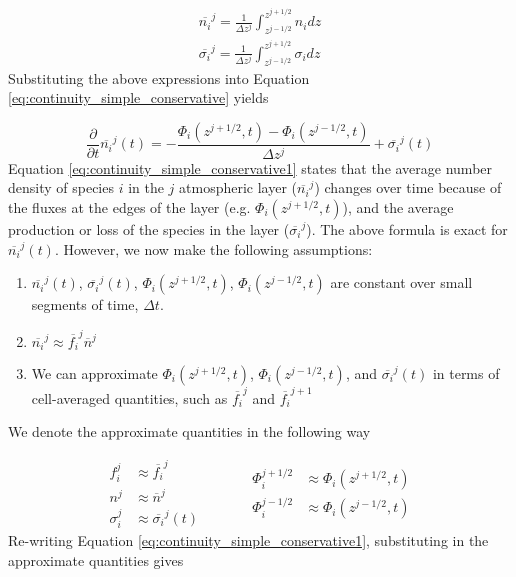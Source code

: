 \begin{align}
  \overline{n_i}^j = \frac{1}{\Delta z^j} \int_{z^{j-1/2}}^{z^{j+1/2}} n_i dz \\
  \overline{\sigma_i}^j = \frac{1}{\Delta z^j} \int_{z^{j-1/2}}^{z^{j+1/2}} \sigma_i dz
\end{align}
Substituting the above expressions into Equation \eqref{eq:continuity_simple_conservative} yields

\begin{equation} \label{eq:continuity_simple_conservative1}
  \frac{\partial}{\partial t} \overline{n_i}^j(t) = - \frac{\Phi_{i}(z^{j+1/2},t) - \Phi_{i}(z^{j-1/2},t)}{\Delta z^j} + \overline{\sigma_i}^j(t)
\end{equation}
Equation \eqref{eq:continuity_simple_conservative1} states that the average number density of species $i$ in the $j$ atmospheric layer ($\overline{n_i}^j$) changes over time because of the fluxes at the edges of the layer (e.g. $\Phi_{i}(z^{j+1/2},t)$), and the average production or loss of the species in the layer ($\overline{\sigma_i}^j$). The above formula is exact for $\overline{n_i}^j(t)$. However, we now make the following assumptions:

\begin{enumerate}
  \item $\overline{n_i}^j(t)$, $\overline{\sigma_i}^j(t)$, $\Phi_{i}(z^{j+1/2},t)$, $\Phi_{i}(z^{j-1/2},t)$  are constant over small segments of time, $\Delta t$.
  \item $\overline{n_i}^j \approx \overline{f_i}^j \overline{n}^j$
  \item We can approximate $\Phi_{i}(z^{j+1/2},t)$, $\Phi_{i}(z^{j-1/2},t)$, and $\overline{\sigma_i}^j(t)$ in terms of cell-averaged quantities, such as $\overline{f_i}^j$ and $\overline{f_i}^{j+1}$
\end{enumerate}
We denote the approximate quantities in the following way

\begin{equation*}
  \begin{aligned}
    f_i^{j} &\approx \overline{f_i}^{j} \\
    n^{j} &\approx \overline{n}^{j} \\
    \sigma_i^j &\approx \overline{\sigma_i}^j(t)
  \end{aligned}
  \quad\quad\quad
  \begin{aligned}
    \Phi_{i}^{j+1/2} &\approx \Phi_{i}(z^{j+1/2},t) \\
    \Phi_{i}^{j-1/2} &\approx \Phi_{i}(z^{j-1/2},t)
  \end{aligned}
\end{equation*}
Re-writing Equation \eqref{eq:continuity_simple_conservative1}, substituting in the approximate quantities gives

